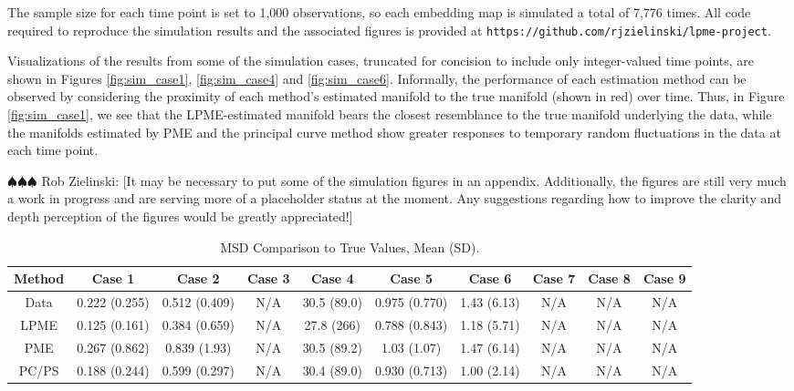 \documentclass[11pt,reqno]{article}
\newcommand{\zielinski}[1]{{\color{blue} \sf $\spadesuit\spadesuit\spadesuit$ Rob Zielinski: [#1]}}
\theoremstyle{definition}
\begin{document}
The sample size for each time point is set to 1,000 observations, so each embedding map is simulated a total of 7,776 times. All code required to reproduce the simulation results and the associated figures is provided at \texttt{https://github.com/rjzielinski/lpme-project}.

Visualizations of the results from some of the simulation cases, truncated for concision to include only integer-valued time points, are shown in Figures \ref{fig:sim_case1}, \ref{fig:sim_case4} and \ref{fig:sim_case6}. Informally, the performance of each estimation method can be observed by considering the proximity of each method's estimated manifold to the true manifold (shown in red) over time. Thus, in Figure \ref{fig:sim_case1}, we see that the LPME-estimated manifold bears the closest resemblance to the true manifold underlying the data, while the manifolds estimated by PME and the principal curve method show greater responses to temporary random fluctuations in the data at each time point.

\zielinski{It may be necessary to put some of the simulation figures in an appendix. Additionally, the figures are still very much a work in progress and are serving more of a placeholder status at the moment. Any suggestions regarding how to improve the clarity and depth perception of the figures would be greatly appreciated!}

\begin{table}[h]
  \footnotesize
  \centering
  \begin{tabular}{|c c c c c c c c c c|}
    \hline
    Method & Case 1 & Case 2 & Case 3 & Case 4 & Case 5 & Case 6 & Case 7 & Case 8 & Case 9 \\
    \hline
    Data & 0.222 (0.255) & 0.512 (0.409) & N/A & 30.5 (89.0) & 0.975 (0.770) & 1.43 (6.13) & N/A & N/A & N/A \\
    LPME & 0.125 (0.161) & 0.384 (0.659) & N/A & 27.8 (266) & 0.788 (0.843) & 1.18 (5.71) & N/A & N/A & N/A \\
    PME & 0.267 (0.862) & 0.839 (1.93) & N/A & 30.5 (89.2) & 1.03 (1.07) & 1.47 (6.14) & N/A & N/A & N/A \\
    PC/PS & 0.188 (0.244) & 0.599 (0.297) & N/A & 30.4 (89.0) & 0.930 (0.713) & 1.00 (2.14) & N/A & N/A & N/A \\
    \hline
  \end{tabular}
  \caption{MSD Comparison to True Values, Mean (SD).}
  \label{table:simulation_results_mean}
\end{table}
\end{document}
